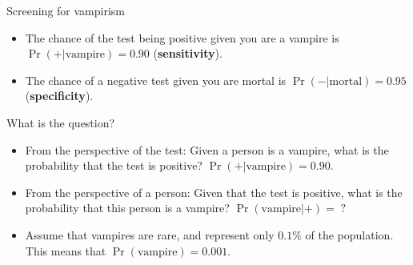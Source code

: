 \documentclass[
  ignorenonframetext,
  aspectratio=169]{beamer}
\providecommand{\tightlist}{%
  \setlength{\itemsep}{0pt}\setlength{\parskip}{0pt}}
\begin{document}
\begin{frame}{Screening for vampirism}
\protect\hypertarget{screening-for-vampirism}{}
\begin{itemize}[<+->]
\tightlist
\item
  The chance of the test being positive given you are a vampire is
  \(\Pr(+|\text{vampire}) = 0.90\) (\textbf{sensitivity}).
\end{itemize}

\begin{itemize}[<+->]
\tightlist
\item
  The chance of a negative test given you are mortal is
  \(\Pr(-|\text{mortal}) = 0.95\) (\textbf{specificity}).
\end{itemize}
\end{frame}

\begin{frame}{What is the question?}
\protect\hypertarget{what-is-the-question}{}
\begin{itemize}[<+->]
\tightlist
\item
  From the perspective of the test: Given a person is a vampire, what is
  the probability that the test is positive?
  \(\Pr(+|\text{vampire}) = 0.90\).
\end{itemize}

\begin{itemize}[<+->]
\tightlist
\item
  From the perspective of a person: Given that the test is positive,
  what is the probability that this person is a vampire?
  \(\Pr(\text{vampire}|+) = \; ?\)
\end{itemize}

\begin{itemize}[<+->]
\tightlist
\item
  Assume that vampires are rare, and represent only \(0.1\%\) of the
  population. This means that \(\Pr(\text{vampire}) = 0.001\).
\end{itemize}
\end{frame}
\end{document}
